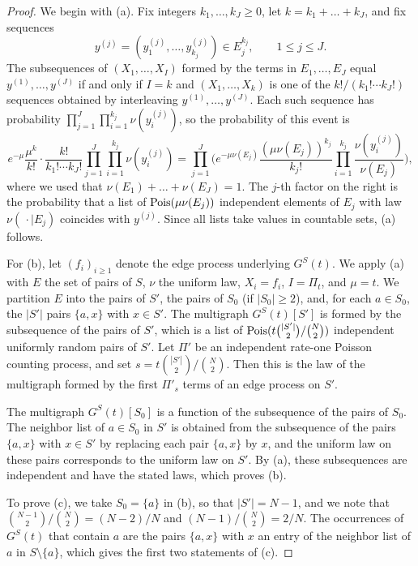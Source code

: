 \begin{proof}
We begin with (a). Fix integers $k_1, \dots, k_{J} \ge 0$, let $k = k_1 + \dots + k_{J}$, and fix sequences
\[
y^{(j)} = (y^{(j)}_1, \dots, y^{(j)}_{k_j}) \in E_j^{k_j}, \qquad 1 \le j \le J.
\]
The subsequences of $(X_1, \dots, X_I)$ formed by the terms in $E_1, \dots, E_{J}$ equal $y^{(1)}, \dots, y^{(J)}$ if and only if $I = k$ and $(X_1, \dots, X_k)$ is one of the $k!/(k_1! \cdots k_{J}!)$ sequences obtained by interleaving $y^{(1)}, \dots, y^{(J)}$. Each such sequence has probability $\prod_{j = 1}^{J} \prod_{i = 1}^{k_j} \nu(y^{(j)}_i)$, so the probability of this event is
\[
e^{-\mu} \frac{\mu^k}{k!} \cdot \frac{k!}{k_1! \cdots k_{J}!} \prod_{j = 1}^{J} \prod_{i = 1}^{k_j} \nu(y^{(j)}_i) = \prod_{j = 1}^{J} \bigg( e^{-\mu \nu(E_j)} \frac{(\mu \nu(E_j))^{k_j}}{k_j!} \prod_{i = 1}^{k_j} \frac{\nu(y^{(j)}_i)}{\nu(E_j)} \bigg),
\]
where we used that $\nu(E_1) + \dots + \nu(E_{J}) = 1$. The $j$-th factor on the right is the probability that a list of $\operatorname{Pois}(\mu \nu(E_j))$ independent elements of $E_j$ with law $\nu(\, \cdot \mid E_j)$ coincides with $y^{(j)}$. Since all lists take values in countable sets, (a) follows.

For (b), let $(f_i)_{i \ge 1}$ denote the edge process underlying $G^S(t)$. We apply (a) with $E$ the set of pairs of $S$, $\nu$ the uniform law, $X_i = f_i$, $I = \Pi_t$, and $\mu = t$. We partition $E$ into the pairs of $S'$, the pairs of $S_0$ (if $|S_0| \ge 2$), and, for each $a \in S_0$, the $|S'|$ pairs $\{a, x\}$ with $x \in S'$. The multigraph $G^S(t)[S']$ is formed by the subsequence of the pairs of $S'$, which is a list of $\operatorname{Pois}(t \binom{|S'|}{2}/\binom{N}{2})$ independent uniformly random pairs of $S'$. Let $\Pi'$ be an independent rate-one Poisson counting process, and set $s = t\binom{|S'|}{2}/\binom N2$. Then this is the law of the multigraph formed by the first $\Pi'_s$ terms of an edge process on $S'$.

The multigraph $G^S(t)[S_0]$ is a function of the subsequence of the pairs of $S_0$. The neighbor list of $a \in S_0$ in $S'$ is obtained from the subsequence of the pairs $\{a, x\}$ with $x \in S'$ by replacing each pair $\{a, x\}$ by $x$, and the uniform law on these pairs corresponds to the uniform law on $S'$. By (a), these subsequences are independent and have the stated laws, which proves (b).

To prove (c), we take $S_0 = \{a\}$ in (b), so that $|S'| = N - 1$, and we note that $\binom{N - 1}{2}/\binom{N}{2} = (N - 2)/N$ and $(N - 1)/\binom{N}{2} = 2/N$. The occurrences of $G^S(t)$ that contain $a$ are the pairs $\{a, x\}$ with $x$ an entry of the neighbor list of $a$ in $S \setminus \{a\}$, which gives the first two statements of (c).
\end{proof}

